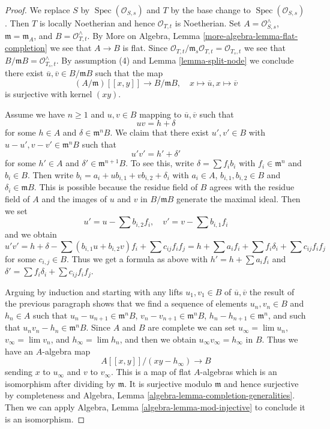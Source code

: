 \documentclass{stacks-project}
\theoremstyle{plain}
\theoremstyle{definition}
\theoremstyle{remark}
\numberwithin{equation}{subsection}
\def\lim{\mathop{\mathrm{lim}}\nolimits}
\def\Spec{\mathop{\mathrm{Spec}}}
\begin{document}
\begin{proof}
We replace $S$ by $\Spec(\mathcal{O}_{S, s})$ and $T$ by the base change
to $\Spec(\mathcal{O}_{S, s})$. Then $T$ is locally Noetherian and hence
$\mathcal{O}_{T, t}$ is Noetherian.
Set $A = \mathcal{O}_{S, s}^\wedge$, $\mathfrak m = \mathfrak m_A$, and
$B = \mathcal{O}_{T, t}^\wedge$. By
More on Algebra, Lemma \ref{more-algebra-lemma-flat-completion}
we see that $A \to B$ is flat. Since
$\mathcal{O}_{T, t}/\mathfrak m_s \mathcal{O}_{T, t} = \mathcal{O}_{T_s, t}$
we see that $B/\mathfrak m B = \mathcal{O}_{T_s, t}^\wedge$.
By assumption (4) and Lemma \ref{lemma-split-node}
we conclude there exist $\overline{u}, \overline{v} \in B/\mathfrak m B$
such that the map
$$
(A/\mathfrak m)[[x, y]] \longrightarrow B/\mathfrak m B,\quad
x \longmapsto \overline{u},
x \longmapsto \overline{v}
$$
is surjective with kernel $(xy)$.

\medskip\noindent
Assume we have $n \geq 1$ and $u, v \in B$ mapping to
$\overline{u}, \overline{v}$ such that
$$
u v = h + \delta
$$
for some $h \in A$ and $\delta \in \mathfrak m^nB$.
We claim that there exist $u', v' \in B$ with
$u - u', v - v' \in \mathfrak m^n B$ such that
$$
u' v' = h' + \delta'
$$
for some $h' \in A$ and $\delta' \in \mathfrak m^{n + 1}B$.
To see this, write $\delta = \sum f_i b_i$ with
$f_i \in \mathfrak m^n$ and $b_i \in B$. Then write
$b_i = a_i + u b_{i, 1} + v b_{i, 2} + \delta_i$ with
$a_i \in A$, $b_{i, 1}, b_{i, 2} \in B$ and $\delta_i \in \mathfrak m B$.
This is possible because the residue field of $B$ agrees with the
residue field of $A$ and the images of $u$ and $v$ in $B/\mathfrak m B$
generate the maximal ideal. Then we set
$$
u' = u - \sum b_{i, 2}f_i,\quad
v' = v - \sum b_{i, 1}f_i
$$
and we obtain
$$
u'v' = h + \delta - \sum (b_{i, 1}u + b_{i, 2}v)f_i + \sum
c_{ij}f_if_j =
h + \sum a_if_i + \sum f_i \delta_i + \sum c_{ij}f_if_j
$$
for some $c_{i, j} \in B$.
Thus we get a formula as above with $h' = h + \sum a_if_i$
and $\delta' = \sum f_i \delta_i + \sum c_{ij}f_if_j$.

\medskip\noindent
Arguing by induction and starting with any lifts $u_1, v_1 \in B$
of $\overline{u}, \overline{v}$ the result of the previous paragraph
shows that we find a sequence of elements
$u_n, v_n \in B$ and $h_n \in A$ such that
$u_n - u_{n + 1} \in \mathfrak m^n B$,
$v_n - v_{n + 1} \in \mathfrak m^n B$,
$h_n - h_{n + 1} \in \mathfrak m^n$,
and such that $u_n v_n - h_n \in \mathfrak m^n B$.
Since $A$ and $B$ are complete we can set
$u_\infty = \lim u_n$, $v_\infty = \lim v_n$,  and
$h_\infty = \lim h_n$, and then we obtain $u_\infty v_\infty = h_\infty$
in $B$. Thus we have an $A$-algebra map
$$
A[[x, y]]/(xy - h_\infty) \longrightarrow B
$$
sending $x$ to $u_\infty$ and $v$ to $v_\infty$.
This is a map of flat $A$-algebras which is an
isomorphism after dividing by $\mathfrak m$.
It is surjective modulo $\mathfrak m$ and hence surjective
by completeness and
Algebra, Lemma \ref{algebra-lemma-completion-generalities}.
Then we can apply Algebra, Lemma \ref{algebra-lemma-mod-injective}
to conclude it is an isomorphism.
\end{proof}
\end{document}
